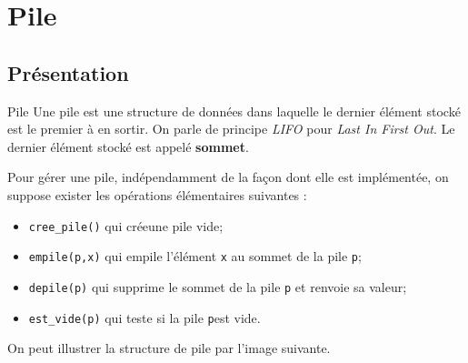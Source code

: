 


\section{Pile}
\subsection{Présentation}
\begin{defi}{Pile}
Une pile est une structure de données dans laquelle le dernier élément stocké est le premier à en sortir. On parle de principe \textit{LIFO} pour \textit{Last In First Out}. Le dernier élément stocké est appelé \textbf{sommet}.
\end{defi}

Pour gérer une pile, indépendamment de la façon dont elle est implémentée, on suppose exister les opérations élémentaires suivantes : 
\begin{itemize}
\item \texttt{cree\_pile()} qui créeune pile vide;
\item \texttt{empile(p,x)} qui empile l'élément \texttt{x} au sommet de la pile \texttt{p};
\item \texttt{depile(p)} qui supprime le sommet de la pile \texttt{p} et renvoie sa valeur;
\item \texttt{est\_vide(p)} qui teste si la pile \texttt{p}est vide.
\end{itemize}

On peut illustrer la structure de pile par l'image suivante.

